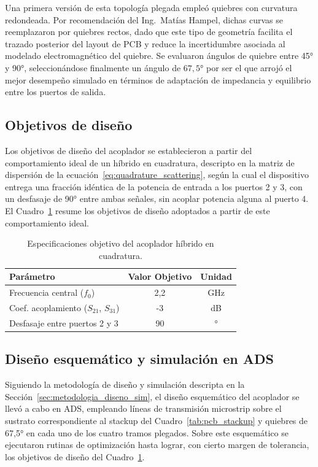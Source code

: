 Una primera versión de esta topología plegada empleó quiebres con curvatura redondeada. Por recomendación del Ing.~Matías Hampel, dichas curvas se reemplazaron por quiebres rectos, dado que este tipo de geometría facilita el trazado posterior del layout de PCB y reduce la incertidumbre asociada al modelado electromagnético del quiebre. Se evaluaron ángulos de quiebre entre 45° y 90°, seleccionándose finalmente un ángulo de $67,5$° por ser el que arrojó el mejor desempeño simulado en términos de adaptación de impedancia y equilibrio entre los puertos de salida.

\subsection{Objetivos de diseño}
Los objetivos de diseño del acoplador se establecieron a partir del comportamiento ideal de un híbrido en cuadratura, descripto en la matriz de dispersión de la ecuación~\eqref{eq:quadrature_scattering}, según la cual el dispositivo entrega una fracción idéntica de la potencia de entrada a los puertos 2 y 3, con un desfasaje de 90° entre ambas señales, sin acoplar potencia alguna al puerto 4. El Cuadro~\ref{tab:objetivos_acoplador} resume los objetivos de diseño adoptados a partir de este comportamiento ideal.

\begin{table}[H]
    \centering
    \caption{Especificaciones objetivo del acoplador híbrido en cuadratura.}
    \label{tab:objetivos_acoplador}
    \begin{tabular}{lcc}
        \hline\hline
        \textbf{Parámetro}                      & \textbf{Valor Objetivo} & \textbf{Unidad} \\
        \hline
        Frecuencia central ($f_0$)              & 2,2                     & GHz             \\
        Coef. acoplamiento ($S_{21}$, $S_{31}$) & -3                      & dB              \\
        Desfasaje entre puertos 2 y 3           & 90                      & °               \\
        \hline\hline
    \end{tabular}
\end{table}

\subsection{Diseño esquemático y simulación en ADS}
Siguiendo la metodología de diseño y simulación descripta en la Sección~\ref{sec:metodologia_diseno_sim}, el diseño esquemático del acoplador se llevó a cabo en ADS, empleando líneas de transmisión microstrip sobre el sustrato correspondiente al stackup del Cuadro~\ref{tab:pcb_stackup} y quiebres de 67,5° en cada uno de los cuatro tramos plegados. Sobre este esquemático se ejecutaron rutinas de optimización hasta lograr, con cierto margen de tolerancia, los objetivos de diseño del Cuadro~\ref{tab:objetivos_acoplador}. 

